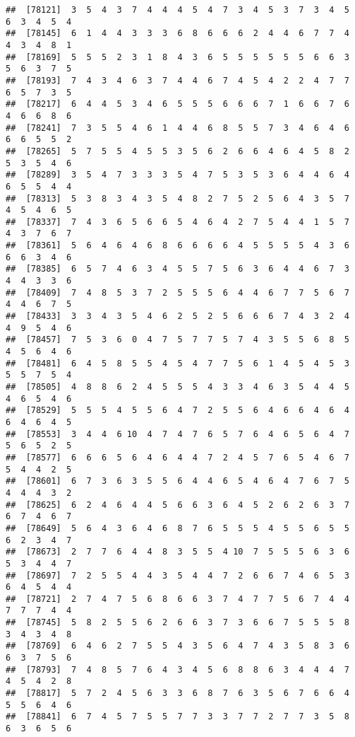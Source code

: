 \documentclass[
]{book}
\begin{document}
\begin{verbatim}
##  [78121]  3  5  4  3  7  4  4  4  5  4  7  3  4  5  3  7  3  4  5  6  3  4  5  4
##  [78145]  6  1  4  4  3  3  3  6  8  6  6  6  2  4  4  6  7  7  4  4  3  4  8  1
##  [78169]  5  5  5  2  3  1  8  4  3  6  5  5  5  5  5  5  6  6  3  5  6  3  7  5
##  [78193]  7  4  3  4  6  3  7  4  4  6  7  4  5  4  2  2  4  7  7  6  5  7  3  5
##  [78217]  6  4  4  5  3  4  6  5  5  5  6  6  6  7  1  6  6  7  6  4  6  6  8  6
##  [78241]  7  3  5  5  4  6  1  4  4  6  8  5  5  7  3  4  6  4  6  6  6  5  5  2
##  [78265]  5  7  5  5  4  5  5  3  5  6  2  6  6  4  6  4  5  8  2  5  3  5  4  6
##  [78289]  3  5  4  7  3  3  3  5  4  7  5  3  5  3  6  4  4  6  4  6  5  5  4  4
##  [78313]  5  3  8  3  4  3  5  4  8  2  7  5  2  5  6  4  3  5  7  4  5  4  6  5
##  [78337]  7  4  3  6  5  6  6  5  4  6  4  2  7  5  4  4  1  5  7  4  3  7  6  7
##  [78361]  5  6  4  6  4  6  8  6  6  6  6  4  5  5  5  5  4  3  6  6  6  3  4  6
##  [78385]  6  5  7  4  6  3  4  5  5  7  5  6  3  6  4  4  6  7  3  4  4  3  3  6
##  [78409]  7  4  8  5  3  7  2  5  5  5  6  4  4  6  7  7  5  6  7  4  4  6  7  5
##  [78433]  3  3  4  3  5  4  6  2  5  2  5  6  6  6  7  4  3  2  4  4  9  5  4  6
##  [78457]  7  5  3  6  0  4  7  5  7  7  5  7  4  3  5  5  6  8  5  4  5  6  4  6
##  [78481]  6  4  5  8  5  5  4  5  4  7  7  5  6  1  4  5  4  5  3  5  5  7  5  4
##  [78505]  4  8  8  6  2  4  5  5  5  4  3  3  4  6  3  5  4  4  5  4  6  5  4  6
##  [78529]  5  5  5  4  5  5  6  4  7  2  5  5  6  4  6  6  4  6  4  6  4  6  4  5
##  [78553]  3  4  4  6 10  4  7  4  7  6  5  7  6  4  6  5  6  4  7  5  6  5  2  5
##  [78577]  6  6  6  5  6  4  6  4  4  7  2  4  5  7  6  5  4  6  7  5  4  4  2  5
##  [78601]  6  7  3  6  3  5  5  6  4  4  6  5  4  6  4  7  6  7  5  4  4  4  3  2
##  [78625]  6  2  4  6  4  4  5  6  6  3  6  4  5  2  6  2  6  3  7  6  7  4  6  7
##  [78649]  5  6  4  3  6  4  6  8  7  6  5  5  5  4  5  5  6  5  5  6  2  3  4  7
##  [78673]  2  7  7  6  4  4  8  3  5  5  4 10  7  5  5  5  6  3  6  5  3  4  4  7
##  [78697]  7  2  5  5  4  4  3  5  4  4  7  2  6  6  7  4  6  5  3  6  4  5  4  4
##  [78721]  2  7  4  7  5  6  8  6  6  3  7  4  7  7  5  6  7  4  4  7  7  7  4  4
##  [78745]  5  8  2  5  5  6  2  6  6  3  7  3  6  6  7  5  5  5  8  3  4  3  4  8
##  [78769]  6  4  6  2  7  5  5  4  3  5  6  4  7  4  3  5  8  3  6  6  3  7  5  6
##  [78793]  7  4  8  5  7  6  4  3  4  5  6  8  8  6  3  4  4  4  7  4  5  4  2  8
##  [78817]  5  7  2  4  5  6  3  3  6  8  7  6  3  5  6  7  6  6  4  5  5  6  4  6
##  [78841]  6  7  4  5  7  5  5  7  7  3  3  7  7  2  7  7  3  5  8  6  3  6  5  6

\end{verbatim}
\end{document}
